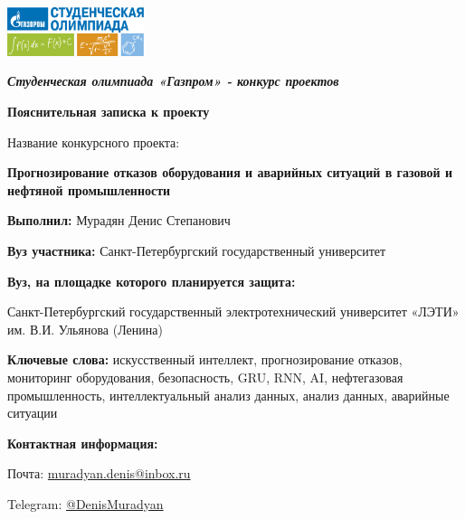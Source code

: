 \documentclass[a4paper,12pt]{article}
\begin{document}
\begin{titlepage}
    \begin{center}
        \includegraphics[width=0.3\textwidth]{../Include/logo.png}\\[1cm]

        {\itshape\Large\bfseries Студенческая олимпиада «Газпром» - конкурс проектов\par}
        \vspace{0.5cm}

        {\Large\bfseries Пояснительная записка к проекту\par}
        \vspace{2cm}

        {\large Название конкурсного проекта: \par}
        \vspace{0.3cm}

        {\LARGE\bfseries Прогнозирование отказов оборудования и аварийных ситуаций в газовой и нефтяной промышленности\par}
        \vspace{0.5cm}

    \end{center}

    \begin{flushleft}
        {\normalsize
        \textbf{Выполнил:} Мурадян Денис Степанович\par
        \vspace{0.3cm}
        \textbf{Вуз участника:} Санкт-Петербургский государственный университет\par
        \vspace{0.3cm}
        \textbf{Вуз, на площадке которого планируется защита:} \par
        Санкт-Петербургский государственный электротехнический университет «ЛЭТИ» им. В.И. Ульянова (Ленина)\par
        \vspace{0.3cm}
        \textbf{Ключевые слова:} искусственный интеллект, прогнозирование отказов, мониторинг оборудования, безопасность,
            GRU, RNN, AI, нефтегазовая промышленность, интеллектуальный анализ данных, анализ данных, аварийные ситуации\par
        \textbf{Контактная информация:}\par
        \quad Почта: \href{mailto:muradyan.denis@inbox.ru}{muradyan.denis@inbox.ru}\par
        \quad Telegram: \href{https://t.me/DenisMuradyan}{@DenisMuradyan}\par
        }
    \end{flushleft}

\end{titlepage}
\end{document}
